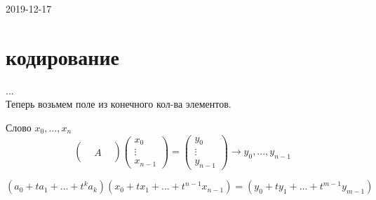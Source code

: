 \documentclass[12pt, fleqn]{article}
\begin{document}
 
\begin{lect}{2019-12-17}\\
    \section{кодирование}
    ...\\
    Теперь возьмем поле из конечного кол-ва элементов.

    \begin{definition} 
        Слово $x_0, ..., x_n$
        \[\begin{pmatrix}
            & & \\
            & A &\\
            & & 
        \end{pmatrix} \begin{pmatrix}
            x_0\\
            \vdots\\
            x_{n - 1} 
        \end{pmatrix} = \begin{pmatrix}
            y_0\\
            \vdots\\
            y_{n - 1} 
        \end{pmatrix} \to y_0, ..., y_{n - 1} \]
    \end{definition}

    \begin{Definition}
        \[(a_0 + ta_1 + ... + t^ka_k)(x_0 + tx_1 + ... + t^{n - 1}x_{n - 1}  ) =
        (y_0 + ty_1 + ... + t^{m - 1}y_{m - 1}  )\]
    \end{Definition}
    

\end{lect}
\end{document}
